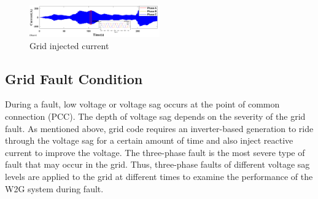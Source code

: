 \documentclass[conference]{IEEEtran}
\begin{document}
\begin{figure}[h!]
    \centering
    \includegraphics[width=0.5\textwidth]{Figs/5_3_1/grid current merged.png}
    \caption{Grid injected current  }
    \label{fig:LPMG_position_velocity}
\end{figure}

\subsection{Grid Fault Condition}
During a fault, low voltage or voltage sag occurs at the point of common connection (PCC). The depth of voltage sag depends on the severity of the grid fault. As mentioned above, grid code requires an inverter-based generation to ride through the voltage sag for a certain amount of time and also inject reactive current to improve the voltage. The three-phase fault is the most severe type of fault that may occur in the grid. Thus, three-phase faults of different voltage sag levels are applied to the grid at different times to examine the performance of the W2G system during fault.
\end{document}
